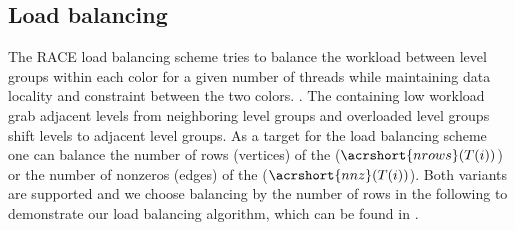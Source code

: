   \subsection{Load balancing}\label{subsec:LB} 
The RACE load balancing scheme tries to balance the workload between level groups 
within each color for a given number of threads while maintaining data locality 
and \DK constraint between the two colors. . 
The \levelGroups containing low workload grab adjacent levels from neighboring level groups and overloaded level groups shift levels to adjacent level groups. As a target for the load balancing scheme one can balance the number of rows (\ie vertices) of the \levelGroups ($\acrshort{nrows}(T(i))$)  or the number of nonzeros (\ie edges) of the \levelGroups ($\acrshort{nnz}(T(i))$). Both variants are supported and we choose balancing by the number of rows in the following to demonstrate our load balancing algorithm, which can be found in .
 
